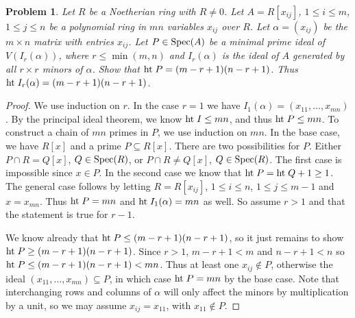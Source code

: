 \documentclass{article}
\newcommand{\spec}{\textup{Spec}}
\newcommand{\Ht}{\textup{ht}\;}
\newtheorem{problem}{Problem}
\begin{document}
\begin{problem}
\label{minors}
Let $R$ be a Noetherian ring with $R \neq 0$. Let $A = R[x_{ij}]$, $1 \leq i \leq m$, $1 \leq j \leq n$ be a polynomial ring in $mn$ variables $x_{ij}$ over $R$. Let $\alpha = (x_{ij})$ be the $m \times n$ matrix with entries $x_{ij}$. Let $P \in \spec(A)$ be a minimal prime ideal of $V(I_r(\alpha))$, where $r \leq \min(m,n)$ and $I_r(\alpha)$ is the ideal of $A$ generated by all $r \times r$ minors of $\alpha$. Show that $\Ht P = (m-r+1)(n-r+1)$. Thus $\Ht I_r(\alpha) = (m-r+1)(n-r+1)$.
\end{problem}
\begin{proof}
We use induction on $r$. In the case $r = 1$ we have $I_1(\alpha) = (x_{11}, \dots , x_{mn})$. By the principal ideal theorem, we know $\Ht I \leq mn$, and thus $\Ht P \leq mn$. To construct a chain of $mn$ primes in $P$, we use induction on $mn$. In the base case, we have $R[x]$ and a prime $P \subseteq R[x]$. There are two possibilities for $P$. Either $P \cap R = Q[x]$, $Q \in \spec(R)$, or $P \cap R \neq Q[x]$, $Q \in \spec(R)$. The first case is impossible since $x \in P$. In the second case we know that $\Ht P = \Ht Q + 1 \geq 1$. The general case follows by letting $R = R[x_{ij}]$, $1 \leq i \leq n$, $1 \leq j \leq m-1$ and $x = x_{mn}$. Thus $\Ht P = mn$ and $\Ht I_1(\alpha) = mn$ as well. So assume $r > 1$ and that the statement is true for $r - 1$.

We know already that $\Ht P \leq (m-r+1)(n-r+1)$, so it just remains to show $\Ht P \geq (m-r+1)(n-r+1)$. Since $r > 1$, $m-r+1 < m$ and $n-r+1<n$ so $\Ht P \leq (m-r+1)(n-r+1) < mn$. Thus at least one $x_{ij} \notin P$, otherwise the ideal $(x_{11}, \dots , x_{mn}) \subseteq P$, in which case $\Ht P = mn$ by the base case. Note that interchanging rows and columns of $\alpha$ will only affect the minors by multiplication by a unit, so we may assume $x_{ij} = x_{11}$, with $x_{11} \notin P$.


\end{proof}
\end{document}
